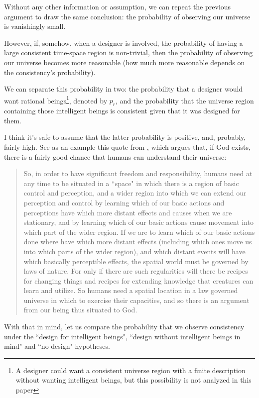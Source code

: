 \documentclass[a4paper
,draft
]{article}
\newcommand{\ghilimele}[1]{``#1"}
\begin{document}
Without any other information or assumption,
we can repeat the previous argument to draw the same conclusion:
the probability of observing our universe is vanishingly small.

However, if, somehow, when a designer is involved, the probability of having
a large consistent time-space region is non-trivial, then
the probability of observing our universe becomes more reasonable (how much
more reasonable depends on the consistency's probability).

We can separate this probability in two: the probability that a designer
would want rational beings\footnote{A designer could want a consistent universe
region with a finite
description without wanting intelligent beings, but this possibility is not
analyzed in this paper}, denoted by $p_r$, and
the probability that the universe region containing
those intelligent beings is consistent
given that it was designed for them.

I think it's safe to assume that the latter probability is positive,
and, probably, fairly high. See as an example this quote from
\textcite{Swinburne2003}, which argues that, if God exists,
there is a fairly good chance that humans can understand their universe:

\begin{quote}
  So, in order to have significant freedom and responsibility, humans need
  at any time to be situated in a \ghilimele{space} in which there is a
  region of basic control and perception, and a wider region into which
  we can extend our perception and control by learning which of our
  basic actions and perceptions have which more distant effects and causes
  when we are stationary, and by learning which of our basic actions cause
  movement into which part of the wider region.
  If we are to learn which of our basic actions done where have which
  more distant effects (including which ones move us into which parts
  of the wider region), and which distant events will have which basically
  perceptible effects, the spatial world must be governed by laws of nature.
  For only if there are such regularities will there be recipes for changing
  things and recipes for extending knowledge that creatures can learn and
  utilize.
  So humans need a spatial location in a law governed universe in which to
  exercise their capacities, and so there is an argument from our being thus
  situated to God.
\end{quote}

With that in mind, let us compare the probability that
we observe consistency under the \ghilimele{design for intelligent beings},
\ghilimele{design without intelligent beings in mind} and
\ghilimele{no design} hypotheses.
\end{document}
